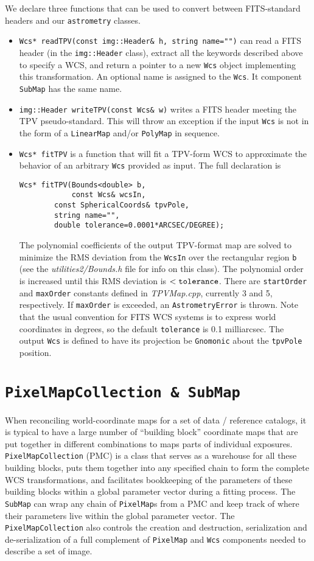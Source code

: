 \documentclass[11pt,preprint,flushrt]{aastex}
\begin{document}
We declare three functions that can be used to convert between FITS-standard headers and our {\tt astrometry} classes.
\begin{itemize}
\item {\tt Wcs* readTPV(const img::Header\& h, string name="")} can read a FITS header (in the {\tt img::Header} class), extract all the keywords described above to specify a WCS, and return a pointer to a new {\tt Wcs} object implementing this transformation.  An optional name is assigned to the {\tt Wcs}.  It component {\tt SubMap} has the same name.
\item {\tt img::Header writeTPV(const Wcs\& w)} writes a FITS header meeting the TPV pseudo-standard.  This will throw an exception if the input {\tt Wcs} is not in the form of a {\tt LinearMap} and/or {\tt PolyMap} in sequence.
\item {\tt Wcs* fitTPV} is a function that will fit a TPV-form WCS to approximate the behavior of an arbitrary {\tt Wcs} provided as  input.  The full declaration is
\begin{verbatim}
Wcs* fitTPV(Bounds<double> b,
            const Wcs& wcsIn,
	    const SphericalCoords& tpvPole,
	    string name="",
	    double tolerance=0.0001*ARCSEC/DEGREE);
\end{verbatim}
The polynomial coefficients of the output TPV-format map are solved to minimize the RMS deviation from the {\tt WcsIn} over the rectangular region {\tt b} (see the {\it utilities2/Bounds.h} file for info on this class).   The polynomial order is increased until this RMS deviation is $<{\tt tolerance}$.  There are {\tt startOrder} and {\tt maxOrder} constants defined in {\it TPVMap.cpp}, currently 3 and 5, respectively.  If {\tt maxOrder} is exceeded, an {\tt AstrometryError} is thrown.  Note that the usual convention for FITS WCS systems is to express world coordinates in degrees, so the default {\tt tolerance} is 0.1 milliarcsec.  The output {\tt Wcs} is defined to have its projection be {\tt Gnomonic} about the {\tt tpvPole} position.
\end{itemize}

\section{\tt PixelMapCollection \& SubMap}
\label{pmc}

When reconciling world-coordinate maps for a set of data / reference catalogs, it is typical to have a large number of ``building block'' coordinate maps that are put together in different combinations to maps parts of individual exposures.  {\tt PixelMapCollection} (PMC) is a class that serves as a warehouse for all these building blocks, puts them together into any specified chain to form the complete WCS transformations, and facilitates bookkeeping of the parameters of these building blocks within a global parameter vector during a fitting process.  The {\tt SubMap} can wrap any chain of {\tt PixelMap}s from a PMC and keep track of where their parameters live within the global parameter vector.  The {\tt PixelMapCollection} also controls the creation and destruction, serialization and de-serialization of a full complement of {\tt PixelMap} and {\tt Wcs} components needed to describe a set of image.
\end{document}
